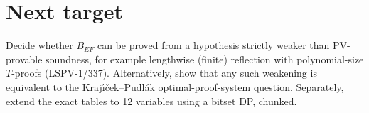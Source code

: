 \documentclass[11pt]{article}
\begin{document}
\section{Next target}
Decide whether $B_{EF}$ can be proved from a hypothesis strictly weaker than PV-provable soundness,
for example lengthwise (finite) reflection with polynomial-size $T$-proofs (LSPV-1/337). Alternatively,
show that any such weakening is equivalent to the Kraj\'{\i}\v{c}ek--Pudl\'ak optimal-proof-system question.
Separately, extend the exact tables to 12 variables using a bitset DP, chunked.
\end{document}
